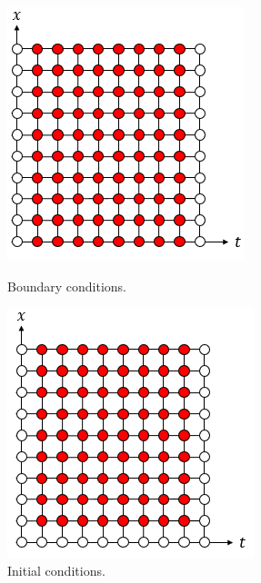 \documentclass[12pt, oneside]{book}
\theoremstyle{plain}
\theoremstyle{definition}
\begin{document}
\begin{figure}[!htb]
  \begin{minipage}[b]{0.5\textwidth}
    \includegraphics[width=\textwidth]{Boundary.png}
    \caption{Boundary conditions.}
  \end{minipage}
  \begin{minipage}[b]{0.5\textwidth}
    \includegraphics[width=\textwidth]{Initial.png}
    \caption{Initial conditions.}
  \end{minipage}
\end{figure}
\end{document}
